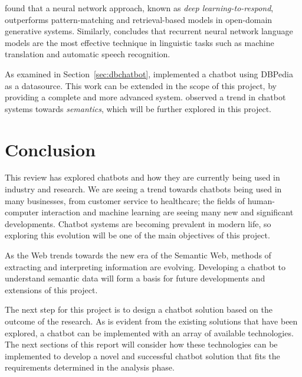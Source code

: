 \citet{yan2016learning} found that a neural network approach, known as {\it deep learning-to-respond}, outperforms pattern-matching and retrieval-based models in open-domain generative systems. Similarly, \citet{mikolov2011extensions} concludes that recurrent neural network language models are the most effective technique in linguistic tasks such as machine translation and automatic speech recognition.

As examined in Section~\ref{sec:dbchatbot}, \citet{ramngongausbeck2018} implemented a chatbot using DBPedia as a datasource. This work can be extended in the scope of this project, by providing a complete and more advanced system. \citet{bradevsko2012survey} observed a trend in chatbot systems towards {\it semantics}, which will be further explored in this project.

\section{Conclusion}
This review has explored chatbots and how they are currently being used in industry and research. We are seeing a trend towards chatbots being used in many businesses, from customer service to healthcare; the fields of human-computer interaction and machine learning are seeing many new and significant developments. Chatbot systems are becoming prevalent in modern life, so exploring this evolution will be one of the main objectives of this project.

As the Web trends towards the new era of the Semantic Web, methods of extracting and interpreting information are evolving. Developing a chatbot to understand semantic data will form a basis for future developments and extensions of this project.

The next step for this project is to design a chatbot solution based on the outcome of the research. As is evident from the existing solutions that have been explored, a chatbot can be implemented with an array of available technologies. The next sections of this report will consider how these technologies can be implemented to develop a novel and successful chatbot solution that fits the requirements determined in the analysis phase.





